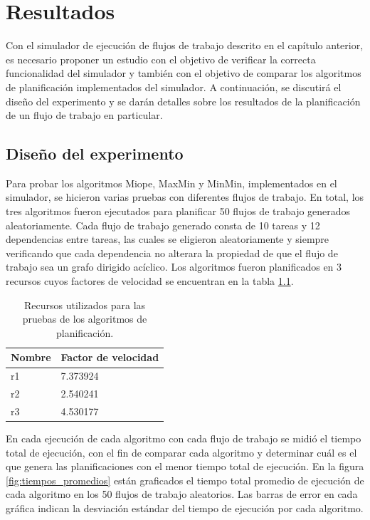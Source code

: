 \chapter{Resultados}


Con el simulador de ejecución de flujos de trabajo descrito en el capítulo anterior, es necesario proponer un estudio con el objetivo de verificar la correcta funcionalidad del simulador y también con el objetivo de comparar los algoritmos de planificación implementados del simulador. A continuación, se discutirá el diseño del experimento y se darán detalles sobre los resultados de la planificación de un flujo de trabajo en particular.

\section{Diseño del experimento}

Para probar los algoritmos Miope, MaxMin y MinMin, implementados en el simulador, se hicieron varias pruebas con diferentes flujos de trabajo. En total, los tres algoritmos fueron ejecutados para planificar 50 flujos de trabajo generados aleatoriamente. Cada flujo de trabajo generado consta de 10 tareas y 12 dependencias entre tareas, las cuales se eligieron aleatoriamente y siempre verificando que cada dependencia no alterara la propiedad de que el flujo de trabajo sea un grafo dirigido acíclico. Los algoritmos fueron planificados en 3 recursos cuyos factores de velocidad se encuentran en la tabla \ref{table:resources}.

\begin{table}
\begin{center}
\begin{tabular}{|l|l|}
\hline
Nombre&Factor de velocidad\\
\hline
r1&7.373924\\
\hline
r2&2.540241\\
\hline
r3&4.530177\\
\hline
\end{tabular}
\end{center}
\label{table:resources}
\caption{Recursos utilizados para las pruebas de los algoritmos de planificación.}
\end{table}

En cada ejecución de cada algoritmo con cada flujo de trabajo se midió el tiempo total de ejecución, con el fin de comparar cada algoritmo y determinar cuál es el que genera las planificaciones con el menor tiempo total de ejecución. En la figura \ref{fig:tiempos_promedios} están graficados el tiempo total promedio de ejecución de cada algoritmo en los 50 flujos de trabajo aleatorios. Las barras de error en cada gráfica indican la desviación estándar del tiempo de ejecución por cada algoritmo.

